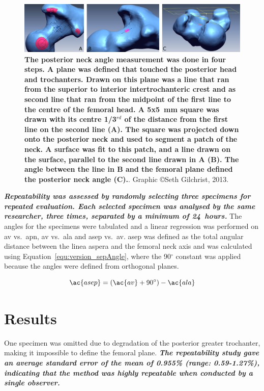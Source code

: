\begin{figure}
\centering
\includegraphics[width=\linewidth]{./appendixVersion/figures/pn}
\caption[Digital posterior neck measurement]{
\textbf{The posterior neck angle measurement was done in four steps. A plane was defined that touched the posterior head and trochanters. Drawn on this plane was a line that ran from the superior to interior intertrochanteric crest and as second line that ran from the midpoint of the first line to the centre of the femoral head. A 5x5~\ac{mm} square was drawn with its centre 1/3$^{rd}$ of the distance from the first line on the second line (A). The square was projected down onto the posterior neck and used to segment a patch of the neck. A surface was fit to this patch, and a line drawn on the surface, parallel to the second line drawn in A (B). The angle between the line in B and the femoral plane defined the posterior neck angle (C).}. Graphic \copyright Seth Gilchrist, 2013.}
\label{fig:version_pn}
\end{figure}

\textit{\textbf{Repeatability was assessed by randomly selecting three specimens for repeated evaluation.
Each selected specimen was analysed by the same researcher, three times, separated by a minimum of 24~hours.}}
The angles for the specimens were tabulated and a linear regression was performed on \ac{av} vs.\ \ac{apn}, \ac{av} vs.\ \ac{ala} and \ac{asep} vs.\ \ac{av}.
\ac{asep} was defined as the total angular distance between the linea aspera and the femoral neck axis and was calculated using Equation~\ref{equ:version_sepAngle}, where the 90$^\circ$ constant was applied because the angles were defined from orthogonal planes.

\begin{equation}
\label{equ:version_sepAngle}
\ac{asep} = (\ac{av}+90^{\circ})-\ac{ala}
\end{equation}

\section{Results}
\label{sec:version_results}
One specimen was omitted due to degradation of the posterior greater trochanter, making it impossible to define the femoral plane.
\textit{\textbf{The repeatability study gave an average standard error of the mean of 0.955\% (range: 0.59-1.27\%), indicating that the method was highly repeatable when conducted by a single observer.}}

